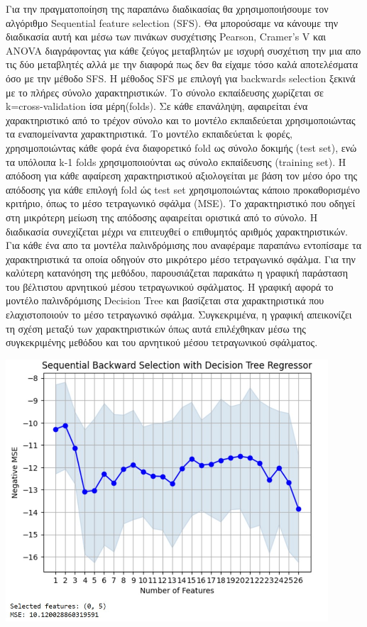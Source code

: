 \documentclass[12pt]{article}
\begin{document}
 Για την πραγματοποίηση της παραπάνω διαδικασίας θα χρησιμοποιήσουμε τον αλγόριθμο Sequential feature selection (SFS). Θα μπορούσαμε να κάνουμε την διαδικασία αυτή και μέσω των πινάκων συσχέτισης Pearson, Cramer's V και ANOVA διαγράφοντας για κάθε ζεύγος μεταβλητών με ισχυρή συσχέτιση την μια απο τις δύο μεταβλητές αλλά με την διαφορά πως δεν θα είχαμε τόσο καλά αποτελέσματα όσο με την μέθοδο SFS. Η μέθοδος SFS με επιλογή για backwards selection ξεκινά με το πλήρες σύνολο χαρακτηριστικών. Το σύνολο εκπαίδευσης χωρίζεται σε k=cross-validation ίσα μέρη(folds). Σε κάθε επανάληψη, αφαιρείται ένα χαρακτηριστικό από το τρέχον σύνολο και το μοντέλο εκπαιδεύεται χρησιμοποιώντας τα εναπομείναντα χαρακτηριστικά. Το μοντέλο εκπαιδεύεται k φορές, χρησιμοποιώντας κάθε φορά ένα διαφορετικό fold ως σύνολο δοκιμής (test set), ενώ τα υπόλοιπα k-1 folds χρησιμοποιούνται ως σύνολο εκπαίδευσης (training set). Η απόδοση για κάθε αφαίρεση χαρακτηριστικού αξιολογείται με βάση τον μέσο όρο της απόδοσης για κάθε επιλογή fold ώς test set χρησιμοποιώντας κάποιο προκαθορισμένο κριτήριο, όπως το μέσο τετραγωνικό σφάλμα (MSE). Το χαρακτηριστικό που οδηγεί στη μικρότερη μείωση της απόδοσης αφαιρείται οριστικά από το σύνολο. Η διαδικασία συνεχίζεται μέχρι να επιτευχθεί ο επιθυμητός αριθμός χαρακτηριστικών. Για κάθε ένα απο τα μοντέλα παλινδρόμισης που αναφέραμε παραπάνω εντοπίσαμε τα χαρακτηριστικά τα οποία οδηγούν στο μικρότερο μέσο τετραγωνικό σφάλμα. Για την καλύτερη κατανόηση της μεθόδου, παρουσιάζεται παρακάτω η γραφική παράσταση του βέλτιστου αρνητικού μέσου τετραγωνικού σφάλματος. Η γραφική αφορά το μοντέλο παλινδρόμισης Decision Tree και βασίζεται στα χαρακτηριστικά που ελαχιστοποιούν το μέσο τετραγωνικό σφάλμα. Συγκεκριμένα, η γραφική απεικονίζει τη σχέση μεταξύ των χαρακτηριστικών όπως αυτά επιλέχθηκαν μέσω της συγκεκριμένης μεθόδου και του αρνητικού μέσου τετραγωνικού σφάλματος.

\begin{center}
    \includegraphics[width=0.9\textwidth]{./images/icon8.jpg}
    
\end{center}
\end{document}
